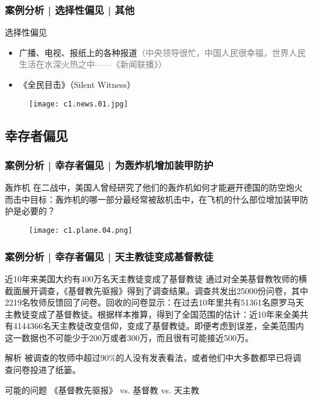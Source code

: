 \begin{frame}
  \frametitle{案例分析 | 选择性偏见 | 其他}
  \begin{block}{选择性偏见}
    \begin{itemize}
      \item 广播、电视、报纸上的各种报道\textcolor{gray}{（中央领导很忙，中国人民很幸福，世界人民生活在水深火热之中——《新闻联播》）}
      \item 《全民目击》（Silent Witness）
    \end{itemize}
    \vspace{-1em}
    \begin{figure}
      \centering
      \texttt{[image: c1.news.01.jpg]}
    \end{figure}
  \end{block}
\end{frame}

\subsection{幸存者偏见}
\begin{frame}
  \frametitle{案例分析 | 幸存者偏见 | 为轰炸机增加装甲防护}
  \begin{block}{轰炸机}
在二战中，美国人曾经研究了他们的轰炸机如何才能避开德国的防空炮火而击中目标：轰炸机的哪一部分最经常被敌机击中，在飞机的什么部位增加装甲防护是必要的？
  \end{block}
  \begin{figure}
    \centering
    \texttt{[image: c1.plane.04.png]}
  \end{figure}
\end{frame}

\begin{frame}
  \frametitle{案例分析 | 幸存者偏见 | 天主教徒变成基督教徒}
  \begin{block}{近10年来美国大约有400万名天主教徒变成了基督教徒}
通过对全美基督教牧师的横截面展开调查，《基督教先驱报》得到了调查结果。调查共发出25000份问卷，其中2219名牧师反馈回了问卷。回收的问卷显示：在过去10年里共有51361名原罗马天主教徒变成了基督教徒。根据样本推算，得到了全国范围的估计：近10年来全美共有4144366名天主教徒改变信仰，变成了基督教徒。即便考虑到误差，全美范围内这一数据也不可能少于200万或者300万，而且很有可能接近500万。
  \end{block}
  \pause \pause \pause \pause
  \begin{block}{解析}
    被调查的牧师中超过90\%的人没有发表看法，或者他们中大多数都早已将调查问卷投进了纸篓。
  \end{block}
  \pause
  \begin{block}{可能的问题}
    《基督教先驱报》 vs. 基督教 vs. 天主教
  \end{block}
\end{frame}

